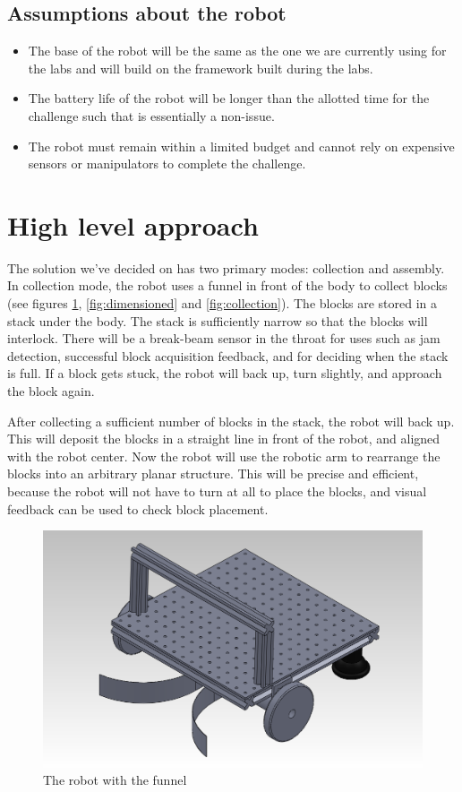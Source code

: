 \documentclass[letterpaper,11pt]{article}
\begin{document}
\subsection{Assumptions about the robot}
\begin{itemize}
 \item The base of the robot will be the same as the one we are currently using for the labs and will build on the framework built during the labs.  
 \item The battery life of the robot will be longer than the allotted time for the challenge such that is essentially a non-issue.
 \item The robot must remain within a limited budget and cannot rely on expensive sensors or manipulators to complete the challenge.
\end{itemize}

\section{High level approach}
The solution we've decided on has two primary modes: collection and assembly.
In collection mode, the robot uses a funnel in front of the body to collect blocks
(see figures \ref{fig:robotFunnel}, \ref{fig:dimensioned} and \ref{fig:collection}).
The blocks are stored in a stack under the body.
The stack is sufficiently narrow so that the blocks will interlock.
There will be a break-beam sensor in the throat for uses such as jam detection,
successful block acquisition feedback, and for deciding when the stack is full.
If a block gets stuck, the robot will back up, turn slightly, and approach the block again.

After collecting a sufficient number of blocks in the stack, the robot will back up.
This will deposit the blocks in a straight line in front of the robot, and aligned with the robot center.
Now the robot will use the robotic arm to rearrange the blocks into an arbitrary planar structure.
This will be precise and efficient, because the robot will not have to turn at all to place the blocks,
and visual feedback can be used to check block placement.
\begin{figure}[h]
 \centering
  \includegraphics[width=4.5in]{images/AssemblyIso}
\caption{The robot with the funnel}
\label{fig:robotFunnel}
\end{figure}
\end{document}
